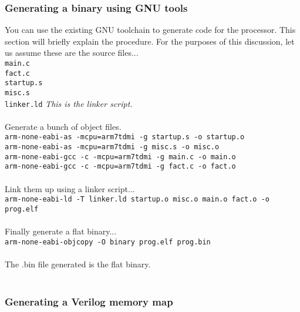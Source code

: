 \documentclass[11pt]{article}
\begin{document}
\subsubsection{Generating a binary using GNU tools}

You can use the existing GNU toolchain to generate code for the processor. This
section will briefly explain the procedure. For the purposes of this 
discussion, let us assume these are the source files...\\

\texttt{main.c} \\
\texttt{fact.c} \\
\texttt{startup.s} \\
\texttt{misc.s} \\
\texttt{linker.ld}  \emph{ This is the linker script.} \\\\

Generate a bunch of object files.\\

\texttt{arm-none-eabi-as -mcpu=arm7tdmi -g startup.s -o startup.o} \\
\texttt{arm-none-eabi-as -mcpu=arm7tdmi -g misc.s -o misc.o} \\
\texttt{arm-none-eabi-gcc -c -mcpu=arm7tdmi -g main.c -o main.o} \\
\texttt{arm-none-eabi-gcc -c -mcpu=arm7tdmi -g fact.c -o fact.o} \\\\

Link them up using a linker script...\\

\texttt{arm-none-eabi-ld -T linker.ld startup.o misc.o main.o fact.o -o 
prog.elf} \\\\

Finally generate a flat binary...\\
\texttt{arm-none-eabi-objcopy -O binary prog.elf prog.bin} \\\\

The .bin file generated is the flat binary.\\\\


\subsubsection{Generating a Verilog memory map}
\end{document}
